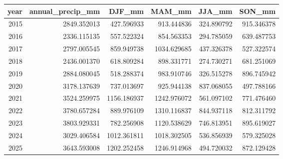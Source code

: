 \begin{tabular}{rrrrrr}
\toprule
year & annual\_precip\_mm & DJF\_mm & MAM\_mm & JJA\_mm & SON\_mm \\
\midrule
2015 & 2849.352013 & 427.596933 & 913.444836 & 324.890792 & 915.346378 \\
2016 & 2336.115135 & 557.522324 & 854.563353 & 294.785059 & 639.487753 \\
2017 & 2797.005545 & 859.949738 & 1034.629685 & 437.326378 & 527.322574 \\
2018 & 2436.001370 & 618.809284 & 898.331771 & 274.730271 & 681.251069 \\
2019 & 2884.080045 & 518.288374 & 983.910746 & 326.515278 & 896.745942 \\
2020 & 3178.137639 & 737.013697 & 925.944138 & 837.068055 & 497.788166 \\
2021 & 3524.259975 & 1156.186937 & 1242.976072 & 561.097102 & 771.476460 \\
2022 & 3780.657284 & 889.976109 & 1310.116837 & 844.937118 & 812.311792 \\
2023 & 3803.929331 & 782.256908 & 1120.538629 & 746.813951 & 895.619027 \\
2024 & 3029.406584 & 1012.361811 & 1018.302505 & 536.856939 & 579.325028 \\
2025 & 3643.593008 & 1202.252458 & 1246.914968 & 494.720032 & 872.129428 \\
\bottomrule
\end{tabular}
